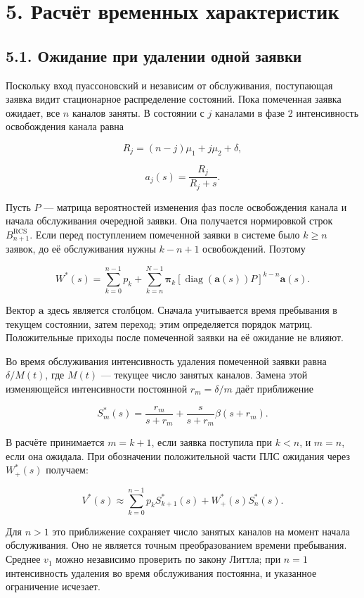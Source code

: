 \section*{5. Расчёт временных характеристик}
\subsection*{5.1. Ожидание при удалении одной заявки}
Поскольку вход пуассоновский и независим от обслуживания, поступающая заявка видит стационарное распределение состояний. Пока помеченная заявка ожидает, все \(n\) каналов заняты. В состоянии с \(j\) каналами в фазе 2 интенсивность освобождения канала равна


\[R_j=(n-j)\mu_1+j\mu_2+\delta,\]

\[a_j(s)=\frac{R_j}{R_j+s}.\]


Пусть \(P\) --- матрица вероятностей изменения фаз после освобождения канала и начала обслуживания очередной заявки. Она получается нормировкой строк \(B_{n+1}^{\mathrm{RCS}}.\) Если перед поступлением помеченной заявки в системе было \(k\ge n\) заявок, до её обслуживания нужны \(k-n+1\) освобождений. Поэтому


\[W^*(s)=\sum_{k=0}^{n-1}p_k+
\sum_{k=n}^{N-1}\boldsymbol\pi_k
\left[\operatorname{diag}(\boldsymbol a(s))P\right]^{k-n}\boldsymbol a(s).\]


Вектор \(\boldsymbol a\) здесь является столбцом. Сначала учитывается время пребывания в текущем состоянии, затем переход; этим определяется порядок матриц. Положительные приходы после помеченной заявки на её ожидание не влияют.

Во время обслуживания интенсивность удаления помеченной заявки равна \(\delta/M(t)\), где \(M(t)\) --- текущее число занятых каналов. Замена этой изменяющейся интенсивности постоянной \(r_m=\delta/m\) даёт приближение


\[S_m^*(s)=\frac{r_m}{s+r_m}+\frac{s}{s+r_m}\beta(s+r_m).\]


В расчёте принимается \(m=k+1\), если заявка поступила при \(k<n\), и \(m=n\), если она ожидала. При обозначении положительной части ПЛС ожидания через \(W_+^*(s)\) получаем:


\[V^*(s)\approx\sum_{k=0}^{n-1}p_k S_{k+1}^*(s)+W_+^*(s)S_n^*(s).\]


Для \(n>1\) это приближение сохраняет число занятых каналов на момент начала обслуживания. Оно не является точным преобразованием времени пребывания. Среднее \(v_1\) можно независимо проверить по закону Литтла; при \(n=1\) интенсивность удаления во время обслуживания постоянна, и указанное ограничение исчезает.

